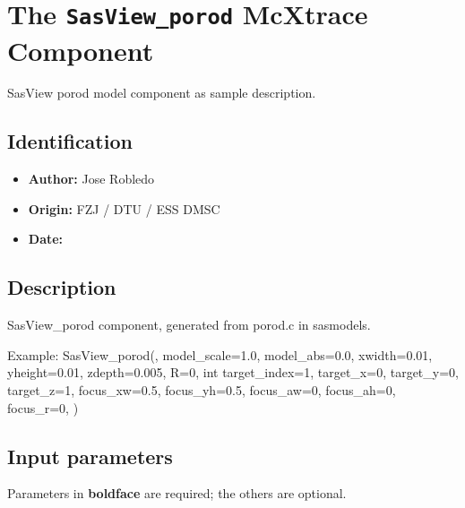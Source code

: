 \section{The \texttt{SasView\_porod} McXtrace Component}
SasView porod model component as sample description.

\subsection*{Identification}
\begin{itemize}
  \item \textbf{Author:} Jose Robledo
  \item \textbf{Origin:} FZJ / DTU / ESS DMSC
  \item \textbf{Date:} 
\end{itemize}

\subsection*{Description}
SasView\_porod component, generated from porod.c in sasmodels.

Example: SasView\_porod(, model\_scale=1.0, model\_abs=0.0, xwidth=0.01, yheight=0.01, zdepth=0.005, R=0, int target\_index=1, target\_x=0, target\_y=0, target\_z=1, focus\_xw=0.5, focus\_yh=0.5, focus\_aw=0, focus\_ah=0, focus\_r=0, )

\subsection*{Input parameters}
Parameters in \textbf{boldface} are required; the others are optional.

